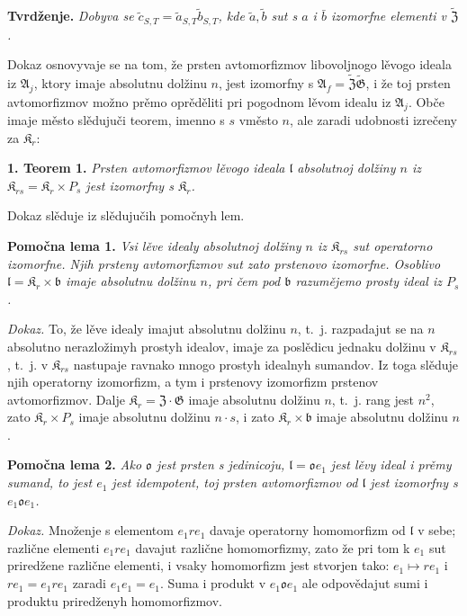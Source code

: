 \documentclass[11pt]{article}
\begin{document}
\noindent\textbf{Tvrdženje.} \emph{Dobyva se \(\tilde c_{S,T}=\tilde a_{S,T}\tilde b_{S,T}\), kde \(\tilde a,\tilde b\) sut s \(a\) i \(\bar b\) izomorfne elementi v \(\widetilde{\mathfrak Z}\).}

Dokaz osnovyvaje se na tom, že prsten avtomorfizmov libovoljnogo lěvogo ideala iz \(\mathfrak A_j\), ktory imaje absolutnu dolžinu \(n\), jest izomorfny s \(\mathfrak A_f=\widetilde{\mathfrak Z}\widetilde{\mathfrak G}\), i že toj prsten avtomorfizmov možno prěmo oprěděliti pri pogodnom lěvom idealu iz \(\mathfrak A_j\). Obče imaje město slědujuči teorem, imenno s \(s\) vměsto \(n\), ale zaradi udobnosti izrečeny za \(\mathfrak K_r\):

\noindent\textbf{1. Teorem 1.} \emph{Prsten avtomorfizmov lěvogo ideala \(\mathfrak l\) absolutnoj dolžiny \(n\) iz \(\mathfrak K_{rs}=\mathfrak K_r\times P_s\) jest izomorfny s \(\mathfrak K_r\).}

Dokaz slěduje iz slědujučih pomočnyh lem.

\noindent\textbf{Pomočna lema 1.} \emph{Vsi lěve idealy absolutnoj dolžiny \(n\) iz \(\mathfrak K_{rs}\) sut operatorno izomorfne. Njih prsteny avtomorfizmov sut zato prstenovo izomorfne. Osoblivo \(\mathfrak l=\mathfrak K_r\times\mathfrak b\) imaje absolutnu dolžinu \(n\), pri čem pod \(\mathfrak b\) razumějemo prosty ideal iz \(P_s\).}

\noindent\emph{Dokaz.} To, že lěve idealy imajut absolutnu dolžinu \(n\), t.~j. razpadajut se na \(n\) absolutno nerazložimyh prostyh idealov, imaje za poslědicu jednaku dolžinu v \(\mathfrak K_{rs}\), t.~j. v \(\mathfrak K_{rs}\) nastupaje ravnako mnogo prostyh idealnyh sumandov. Iz toga slěduje njih operatorny izomorfizm, a tym i prstenovy izomorfizm prstenov avtomorfizmov. Dalje \(\mathfrak K_r=\mathfrak Z\cdot\mathfrak G\) imaje absolutnu dolžinu \(n\), t.~j. rang jest \(n^2\), zato \(\mathfrak K_r\times P_s\) imaje absolutnu dolžinu \(n\cdot s\), i zato \(\mathfrak K_r\times\mathfrak b\) imaje absolutnu dolžinu \(n\).

\noindent\textbf{Pomočna lema 2.} \emph{Ako \(\mathfrak o\) jest prsten s jedinicoju, \(\mathfrak l=\mathfrak o e_1\) jest lěvy ideal i prěmy sumand, to jest \(e_1\) jest idempotent, toj prsten avtomorfizmov od \(\mathfrak l\) jest izomorfny s \(e_1\mathfrak o e_1\).}

\noindent\emph{Dokaz.} Množenje s elementom \(e_1re_1\) davaje operatorny homomorfizm od \(\mathfrak l\) v sebe; različne elementi \(e_1re_1\) davajut različne homomorfizmy, zato že pri tom k \(e_1\) sut priredžene različne elementi, i vsaky homomorfizm jest stvorjen tako: \(e_1\mapsto re_1\) i \(re_1=e_1re_1\) zaradi \(e_1e_1=e_1\). Suma i produkt v \(e_1\mathfrak o e_1\) ale odpovědajut sumi i produktu priredženyh homomorfizmov.
\end{document}
